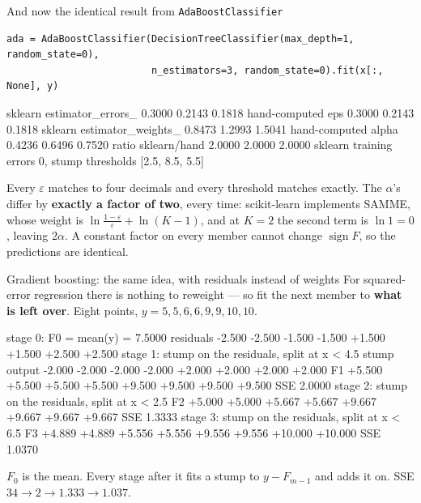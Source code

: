 \documentclass[aspectratio=169]{beamer}
\begin{document}
\begin{frame}[fragile,shrink=6]{And now the identical result from \texttt{AdaBoostClassifier}}
\begin{lstlisting}
ada = AdaBoostClassifier(DecisionTreeClassifier(max_depth=1, random_state=0),
                         n_estimators=3, random_state=0).fit(x[:, None], y)
\end{lstlisting}
\begin{outblk}
sklearn estimator_errors_  0.3000 0.2143 0.1818
hand-computed eps          0.3000 0.2143 0.1818
sklearn estimator_weights_ 0.8473 1.2993 1.5041
hand-computed alpha        0.4236 0.6496 0.7520
ratio sklearn/hand         2.0000 2.0000 2.0000
sklearn training errors 0, stump thresholds [2.5, 8.5, 5.5]
\end{outblk}
  \begin{center}\small
    Every $\varepsilon$ matches to four decimals and every threshold matches
    exactly. The $\alpha$'s differ by \textbf{exactly a factor of two}, every
    time: scikit-learn implements SAMME, whose weight is
    $\ln\frac{1-\varepsilon}{\varepsilon} + \ln(K-1)$, and at $K = 2$ the
    second term is $\ln 1 = 0$, leaving $2\alpha$. A constant factor on every
    member cannot change $\operatorname{sign} F$, so the predictions are
    identical.
  \end{center}
\end{frame}

\begin{frame}[fragile,shrink=11]{Gradient boosting: the same idea, with residuals instead of weights}
  For squared-error regression there is nothing to reweight --- so fit the
  next member to \textbf{what is left over}. Eight points,
  $y = 5,5,6,6,9,9,10,10$.
\begin{outblk}
stage 0: F0 = mean(y) = 7.5000
   residuals -2.500 -2.500 -1.500 -1.500 +1.500 +1.500 +2.500 +2.500
stage 1: stump on the residuals, split at x < 4.5
   stump output -2.000 -2.000 -2.000 -2.000 +2.000 +2.000 +2.000 +2.000
   F1           +5.500 +5.500 +5.500 +5.500 +9.500 +9.500 +9.500 +9.500
   SSE 2.0000
stage 2: stump on the residuals, split at x < 2.5
   F2           +5.000 +5.000 +5.667 +5.667 +9.667 +9.667 +9.667 +9.667
   SSE 1.3333
stage 3: stump on the residuals, split at x < 6.5
   F3           +4.889 +4.889 +5.556 +5.556 +9.556 +9.556 +10.000 +10.000
   SSE 1.0370
\end{outblk}
  \begin{center}\small
    $F_0$ is the mean. Every stage after it fits a stump to $y - F_{m-1}$ and
    adds it on. SSE $34 \to 2 \to 1.333 \to 1.037$.
  \end{center}
\end{frame}
\end{document}
